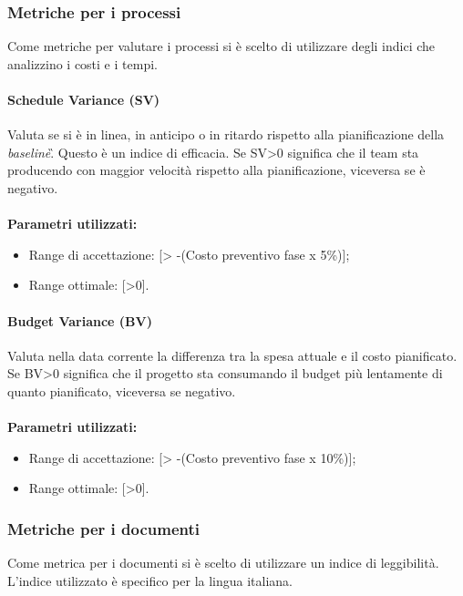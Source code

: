 \subsubsection{Metriche per i processi}
\label{cap: sezione 2.8.1 Metriche per i processi}
Come metriche per valutare i processi si è scelto di utilizzare degli indici che analizzino i costi e i tempi.

\paragraph{Schedule Variance (SV)}

Valuta se si è in linea, in anticipo o in ritardo rispetto alla pianificazione 
della \textit{baseline}\G. Questo è un indice di efficacia. Se SV>0 significa 
che il team sta producendo con maggior velocità 
rispetto alla pianificazione, viceversa se è negativo.\\\\
\textbf{Parametri utilizzati:}
\begin{itemize}
	\item Range di accettazione: [> -(Costo preventivo fase x 5\%)];
	\item Range ottimale: [>0].
\end{itemize}

\paragraph{Budget Variance (BV)}
Valuta nella data corrente la differenza tra la spesa attuale e il costo 
pianificato. Se BV>0 significa che il progetto sta consumando il budget più 
lentamente di 
quanto pianificato, viceversa se negativo.\\\\
\textbf{Parametri utilizzati:}

\begin{itemize}
	\item Range di accettazione: [> -(Costo preventivo fase x 10\%)];
	\item Range ottimale: [>0].
\end{itemize}

\subsubsection{Metriche per i documenti}
\label{cap:sezione 2.9.2 Metriche per i documenti}
Come metrica per i documenti si è scelto di utilizzare un indice di 
leggibilità. L'indice utilizzato è specifico per la lingua italiana.

